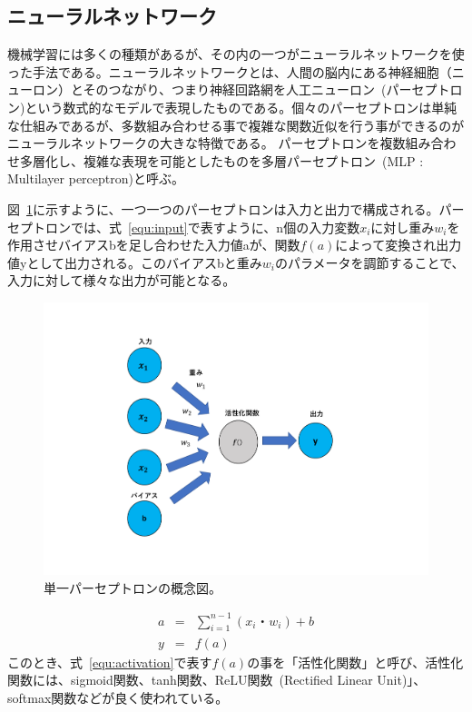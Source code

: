 \subsection{ニューラルネットワーク}
機械学習には多くの種類があるが、その内の一つがニューラルネットワークを使った手法である。ニューラルネットワークとは、人間の脳内にある神経細胞（ニューロン）とそのつながり、つまり神経回路網を人工ニューロン~(パーセプトロン)という数式的なモデルで表現したものである。個々のパーセプトロンは単純な仕組みであるが、多数組み合わせる事で複雑な関数近似を行う事ができるのがニューラルネットワークの大きな特徴である。
パーセプトロンを複数組み合わせ多層化し、複雑な表現を可能としたものを多層パーセプトロン~(MLP : Multilayer perceptron)と呼ぶ。

図~\ref{fig:perce}に示すように、一つ一つのパーセプトロンは入力と出力で構成される。パーセプトロンでは、式~\eqref{equ:input}で表すように、n個の入力変数$x_i$に対し重み$w_i$を作用させバイアスbを足し合わせた入力値aが、関数$f(a)$によって変換され出力値yとして出力される。このバイアスbと重み$w_i$のパラメータを調節することで、入力に対して様々な出力が可能となる。
\begin{figure}[tb]
  \centering
  \includegraphics[clip, width=15cm]{fig/4/parceptron.pdf}
  \caption{単一パーセプトロンの概念図。}
  \label{fig:perce}
\end{figure}
\begin{eqnarray}
    a &=& \sum^{n-1}_{i=1}(x_i・w_i) + b \label{equ:input}\\
    y &=& f(a)\label{equ:activation}
\end{eqnarray}
このとき、式~\eqref{equ:activation}で表す$f(a)$の事を「活性化関数」と呼び、活性化関数には、sigmoid関数、tanh関数、ReLU関数~(Rectified Linear Unit)」、softmax関数などが良く使われている。
